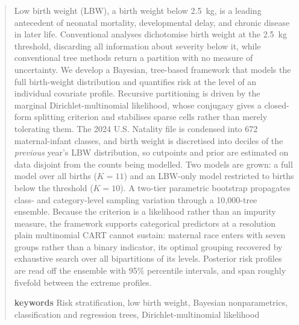 
\thispagestyle{firstpage} %
\begin{abstract}
\fontsize{11}{13}\selectfont
\vspace{1em}
\justifying
Low birth weight (LBW), a birth weight below 2.5~kg, is a leading antecedent of
neonatal mortality, developmental delay, and chronic disease in later life.
Conventional analyses dichotomise birth weight at the 2.5~kg threshold,
discarding all information about severity below it, while conventional tree
methods return a partition with no measure of uncertainty. We develop a
Bayesian, tree-based framework that models the full birth-weight distribution
and quantifies risk at the level of an individual covariate profile. Recursive
partitioning is driven by the marginal Dirichlet-multinomial likelihood, whose
conjugacy gives a closed-form splitting criterion and stabilises sparse cells
rather than merely tolerating them. The 2024 U.S. Natality file is condensed
into 672 maternal-infant classes, and birth weight is discretised into deciles
of the \emph{previous} year's LBW distribution, so cutpoints and prior are
estimated on data disjoint from the counts being modelled. Two models are
grown: a full model over all births ($K=11$) and an LBW-only model restricted
to births below the threshold ($K=10$). A two-tier parametric bootstrap
propagates class- and category-level sampling variation through a
10{,}000-tree ensemble. Because the criterion is a likelihood rather than an
impurity measure, the framework supports categorical predictors at a resolution
plain multinomial CART cannot sustain: maternal race enters with seven groups
rather than a binary indicator, its optimal grouping recovered by exhaustive
search over all bipartitions of its levels. Posterior risk profiles are read
off the ensemble with 95\% percentile intervals, and span roughly fivefold
between the extreme profiles.

\vspace{-0.1cm}
\noindent\textbf{keywords}
Risk stratification, low birth weight, Bayesian nonparametrics, classification
and regression trees, Dirichlet-multinomial likelihood

\end{abstract}

